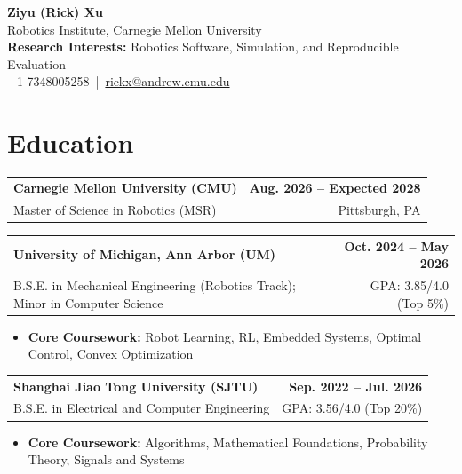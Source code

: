 \documentclass[11pt,letterpaper]{article}
\makeatletter
\newcommand{\resumeSubheading}[4]{
    \begin{tabularx}{\textwidth}{@{}Xr@{}}
        \textbf{#1} & \textbf{#2} \\
        #3 & #4 \\
    \end{tabularx}
}
\makeatother
\begin{document}
\begin{center}
    {\LARGE \textbf{Ziyu (Rick) Xu}} \\[2pt]
    {\small Robotics Institute, Carnegie Mellon University} \\[1pt]
    {\small \textbf{Research Interests:} Robotics Software, Simulation, and Reproducible Evaluation} \\[1pt]
    {\small
    +1 7348005258
    \,|\, 
    \href{mailto:rickx@andrew.cmu.edu}{rickx@andrew.cmu.edu}
    } \\[1pt]
\end{center}

\section*{Education}
\resumeSubheading
{Carnegie Mellon University (CMU)}
{Aug. 2026 -- Expected 2028}
{\hspace*{1.4em}Master of Science in Robotics (MSR)}
{Pittsburgh, PA}
\resumeSubheading
{University of Michigan, Ann Arbor (UM)}
{Oct. 2024 -- May 2026}
{\hspace*{1.4em}B.S.E. in Mechanical Engineering (Robotics Track); Minor in Computer Science}
{GPA: 3.85/4.0 (Top 5\%)}
\begin{itemize}[leftmargin=2.4em, itemsep=0.5pt, topsep=0pt]
    \item \textbf{Core Coursework:} Robot Learning, RL, Embedded Systems, Optimal Control, Convex Optimization
\end{itemize}

\resumeSubheading
{Shanghai Jiao Tong University (SJTU)}
{Sep. 2022 -- Jul. 2026}
{\hspace*{1.4em}B.S.E. in Electrical and Computer Engineering}
{GPA: 3.56/4.0 (Top 20\%)}
\begin{itemize}[leftmargin=2.4em, itemsep=0.5pt, topsep=0pt]
    \item \textbf{Core Coursework:} Algorithms, Mathematical Foundations, Probability Theory, Signals and Systems
\end{itemize}
\end{document}
